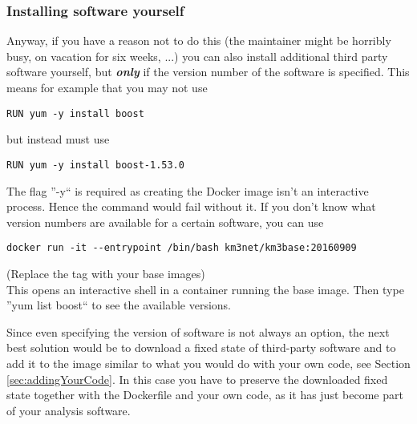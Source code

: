 \documentclass[a4paper, twoside, 11pt]{article}
\begin{document}
\subsubsection{Installing software yourself}
Anyway, if you have a reason not to do this (the maintainer might be horribly busy, on vacation for six weeks, ...) 
you can also install additional third party software yourself, 
but \textbf{\textit{only}} if the version number of the software is specified. 
This means for example that you may not use 
\begin{lstlisting}[basicstyle=\ttfamily\small,upquote=true,columns=flexible,keepspaces=true,frame=single]
RUN yum -y install boost 
\end{lstlisting}
but instead must use 
\begin{lstlisting}[basicstyle=\ttfamily\small,upquote=true,columns=flexible,keepspaces=true,frame=single]
RUN yum -y install boost-1.53.0
\end{lstlisting}
The flag ''-y`` is required as creating the Docker image isn't an interactive process. 
Hence the command would fail without it. 
If you don't know what version numbers are available for a certain software, you can use 
\begin{lstlisting}[basicstyle=\ttfamily\small,upquote=true,columns=flexible,keepspaces=true,frame=single]
docker run -it --entrypoint /bin/bash km3net/km3base:20160909
\end{lstlisting}
(Replace the tag with your base images) \\
This opens an interactive shell in a container running the base image. 
Then type ''yum list boost`` to see the available versions. 

Since even specifying the version of software is not always an option, 
the next best solution would be to download a fixed state of third-party software 
and to add it to the image similar to what you would do with your own code, 
see Section \ref{sec:addingYourCode}. 
In this case you have to preserve the downloaded fixed state together with the Dockerfile and your own code, 
as it has just become part of your analysis software. 
\end{document}
